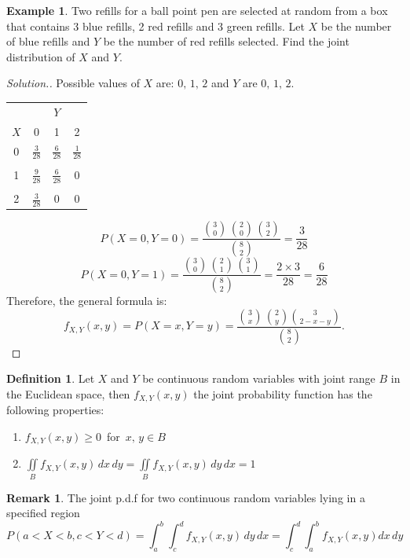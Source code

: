 \documentclass[12pt,a4paper]{report}
\theoremstyle{definition}
\newtheorem{definition}[thm]{Definition}
\newtheorem{example}[thm]{Example}
\newtheorem{remark}[thm]{Remark}
\theoremstyle{plain}
\theoremstyle{definition}
\begin{document}
\begin{example}
\label{ex:refills}
Two refills for a ball point pen are selected at random from a box that contains 3 blue refills, 2 red refills and 3 green refills. Let $X$ be the number of blue refills and $Y$ be the number of red refills selected. Find the joint distribution of $X$ and $Y$.
\end{example}


\begin{proof}[\textit{Solution.}]
Possible values of $X$ are: $0,\, 1,\, 2$ and $Y$ are $0,\, 1,\, 2.$
\begin{table}[H]
\centering
\begin{tabular}{c|ccc}
 &\multicolumn{3}{c}{$Y$}\\
 $X$&0&1&2\\
\hline
0& $\frac{3}{28}$ & $\frac{6}{28}$ & $\frac{1}{28}$\\
&&&\\
1&$\frac{9}{28}$ & $\frac{6}{28}$ & 0\\
&&&\\
2 & $\frac{3}{28}$ & 0 & 0\\
\hline 
\end{tabular}
\end{table}

\[P(X=0, Y=0) =\frac{\binom{3}{0}\,\binom{2}{0}\,\binom{3}{2}}{\binom{8}{2}}=\frac{3}{28}\]
\[P(X=0, Y=1) =\frac{\binom{3}{0}\,\binom{2}{1}\, \binom{3}{1}}{\binom{8}{2}}=\frac{2\times 3}{28}=\frac{6}{28}\]
Therefore, the general formula is:
\[f_{X,Y}(x,y) =P(X=x, Y=y)=\frac{\binom{3}{x}\,\binom{2}{y}\binom{3}{2-x-y}}{\binom{8}{2}}.\]
\end{proof}


\begin{definition}
\label{def:jointpdf}
Let $X$ and $Y$ be continuous random variables with joint range $B$ in the Euclidean space, then $f_{X,Y}(x,y)$ the joint probability function has the following properties:
\begin{enumerate}
\item[a).] $f_{X,Y}(x,y)\geq 0\,$ for  $\,x,\, y\in B$
\item[b).]\quad $\iint\limits_Bf_{X,Y}(x,y)\,dx\, dy=\iint\limits_Bf_{X,Y}(x,y)\,dy\,dx=1$
\end{enumerate}
\end{definition}




\begin{remark}
The joint p.d.f for two continuous random variables lying in a specified region 
\[P(a<X<b, c<Y<d)=\int^b_a\int^d_cf_{X,Y}(x,y)\, dy\, dx=\int^d_c\int^b_af_{X,Y}(x,y)dx\,dy\]
\end{remark}
\end{document}
